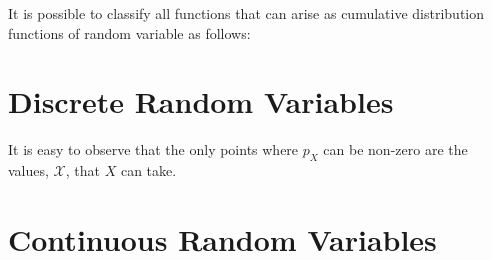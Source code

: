 














It is possible to classify all functions that can arise as cumulative distribution functions of random variable as follows:



\section{Discrete Random Variables}




It is easy to observe that the only points where $p_X$ can be non-zero are the values, $\mathcal{X}$, that $X$ can take. 




\section{Continuous Random Variables}









